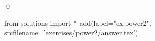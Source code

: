 
\begin{ex} 
  \label{ex:power2}
  
  \qed
\end{ex} 
\begin{python0}
from solutions import *
add(label="ex:power2",
    srcfilename='exercises/power2/answer.tex') 
\end{python0}
